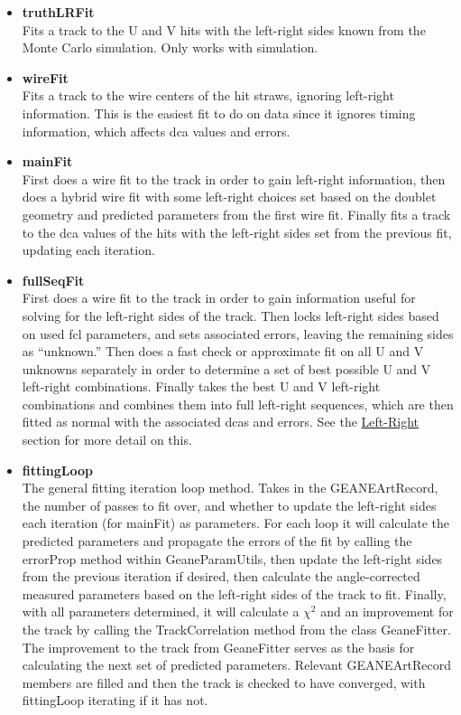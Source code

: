 \begin{enumerate}
        \begin{itemize}

          \item{\bf{truthLRFit}} \\
          Fits a track to the U and V hits with the left-right sides known from the Monte Carlo simulation. Only works with simulation.

          \item{\bf{wireFit}} \\
          Fits a track to the wire centers of the hit straws, ignoring left-right information. This is the easiest fit to do on data since it ignores timing information, which affects dca values and errors.

          \item{\bf{mainFit}} \\
          First does a wire fit to the track in order to gain left-right information, then does a hybrid wire fit with some left-right choices set based on the doublet geometry and predicted parameters from the first wire fit. Finally fits a track to the dca values of the hits with the left-right sides set from the previous fit, updating each iteration.

          \item{\bf{fullSeqFit}} \\
          First does a wire fit to the track in order to gain information useful for solving for the left-right sides of the track. Then locks left-right sides based on used fcl parameters, and sets associated errors, leaving the remaining sides as ``unknown.'' Then does a fast check or approximate fit on all U and V unknowns separately in order to determine a set of best possible U and V left-right combinations. Finally takes the best U and V left-right combinations and combines them into full left-right sequences, which are then fitted as normal with the associated dcas and errors. See the \hyperref[sec:LR]{Left-Right} section for more detail on this.

          \item{\bf{fittingLoop}} \\ 
          The general fitting iteration loop method. Takes in the GEANEArtRecord, the number of passes to fit over, and whether to update the left-right sides each iteration (for mainFit) as parameters. For each loop it will calculate the predicted parameters and propagate the errors of the fit by calling the errorProp method within GeaneParamUtils, then update the left-right sides from the previous iteration if desired, then calculate the angle-corrected measured parameters based on the left-right sides of the track to fit. Finally, with all parameters determined, it will calculate a $\chi^{2}$ and an improvement for the track by calling the TrackCorrelation method from the class GeaneFitter. The improvement to the track from GeaneFitter serves as the basis for calculating the next set of predicted parameters. Relevant GEANEArtRecord members are filled and then the track is checked to have converged, with fittingLoop iterating if it has not. 


\end{itemize}
\end{enumerate}
